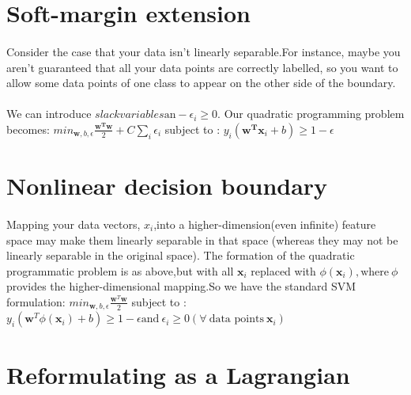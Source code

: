 \documentclass[a4paper]{article}
\begin{document}
\begin{algorithm}
\begin{algorithmic}
     
\section{Soft-margin extension}

\paragraph{}
Consider the case that your data isn't linearly separable.For instance,
maybe you aren’t guaranteed that all your data points are correctly labelled, so you want to allow some data points of one class to appear on the other side of
the boundary.


\paragraph{}
We can introduce $slack variables \text{an}-\epsilon_{i} \geq 0$. Our quadratic programming problem becomes:\newline
$min_{\textbf{w},b,\epsilon} \frac{\textbf{w}^\textbf{T}\textbf{w}}{2}+ C\sum_{i}\epsilon_{i}$\newline
subject to : $y_{i}(\textbf{w}^\textbf{T}\textbf{x}_{i}+ b) \geq 1 -\epsilon$
 
\section{Nonlinear decision boundary}

\paragraph{}
Mapping your data vectors, $x_{i}$,into a higher-dimension(even infinite) feature space may make them linearly separable in  that space (whereas they may not be linearly separable in the original space). The formation of the quadratic programmatic problem is as above,but with all $\textbf{x}_{i}$ replaced with $\phi(\textbf{x}_{i}),\text{where} \ \phi $provides the higher-dimensional mapping.So we have the standard SVM formulation: \newline
$min_{\textbf{w},b,\epsilon}\frac{\textbf{w}^T\textbf{w}}{2}$\newline
subject to : $y_{i}(\textbf{w}^T\phi(\textbf{x}_{i}) + b ) \geq 1 - \epsilon \text{and} \ \epsilon_{i} \geq 0 (\forall \  \text{data points} \  \textbf{x}_{i})$

\section{Reformulating as a Lagrangian}

\end{algorithmic}
\end{algorithm}
\end{document}
